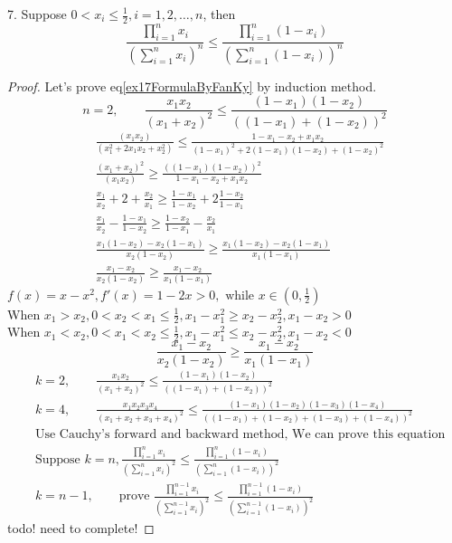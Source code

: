 \begin{example}
	7. Suppose $ 0<x_i\le \frac{1}{2}, i=1,2,\dots,n $, then
	\begin{equation}\label{ex17FormulaByFanKy}
		\frac{\prod_{i=1}^n x_i}{(\sum_{i=1}^n x_i)^n} \le \frac{\prod_{i=1}^n(1-x_i)}{(\sum_{i=1}^n(1-x_i))^n}
	\end{equation}
\begin{proof}
	Let's prove eq\ref{ex17FormulaByFanKy} by induction method.
	\begin{equation*}
		n=2,\qquad \frac{x_1x_2}{(x_1+x_2)^2}\le \frac{(1-x_1)(1-x_2)}{((1-x_1)+(1-x_2))^2}
	\end{equation*}
	\begin{align*}
		&\frac{(x_1x_2)}{(x_1^2+2x_1x_2+x_2^2)} \le \frac{1-x_1-x_2+x_1x_2}{(1-x_1)^2+2(1-x_1)(1-x_2)+(1-x_2)^2}\\
		&\frac{(x_1+x_2)^2}{(x_1x_2)} \ge \frac{((1-x_1)(1-x_2))^2}{1-x_1-x_2+x_1x_2}\\
		&\frac{x_1}{x_2} + 2 + \frac{x_2}{x_1} \ge \frac{1-x_1}{1-x_2} + 2\frac{1-x_2}{1-x_1}\\
		&\frac{x_1}{x_2} - \frac{1-x_1}{1-x_2} \ge \frac{1-x_2}{1-x_1} - \frac{x_2}{x_1}\\
		&\frac{x_1(1-x_2) - x_2(1-x_1)}{x_2(1-x_2)} \ge \frac{x_1(1-x_2)-x_2(1-x_1)}{x_1(1-x_1)}\\
		&\frac{x_1-x_2}{x_2(1-x_2)} \ge \frac{x_1 - x_2}{x_1(1-x_1)}
	\end{align*}
$ f(x) = x-x^2, f'(x) = 1-2x>0,\text{ while }x\in(0,\frac{1}{2})  $\\
When $ x_1>x_2 , 0<x_2<x_1\le \frac{1}{2}, x_1-x_1^2 \ge x_2-x_2^2, x_1-x_2>0$\\
When $ x_1<x_2 , 0<x_1<x_2\le \frac{1}{2}, x_1-x_1^2 \le x_2-x_2^2, x_1-x_2<0$\\
\begin{equation*}
	 \frac{x_1-x_2}{x_2(1-x_2)} \ge \frac{x_1 - x_2}{x_1(1-x_1)} 
\end{equation*}
\begin{align*}
	&k=2,\qquad \frac{x_1x_2}{(x_1+x_2)^2}\le \frac{(1-x_1)(1-x_2)}{((1-x_1)+(1-x_2))^2}\\
	&k=4,\qquad \frac{x_1x_2x_3x_4}{(x_1+x_2+x_3+x_4)^2}\le 
	\frac{(1-x_1)(1-x_2)(1-x_3)(1-x_4)}{((1-x_1)+(1-x_2)+(1-x_3)+(1-x_4))^2}\\
	&\text{Use Cauchy's forward and backward method, We can prove this equation}\\
	&\text{Suppose }k=n,\frac{\prod_{i=1}^n x_i}{(\sum_{i=1}^n x_i)^2} \le 
	\frac{\prod_{i=1}^n (1-x_i)}{(\sum_{i=1}^n (1-x_i))^2}\\
	&k = n-1,\qquad \text{prove  } \frac{\prod_{i=1}^{n-1} x_i}{(\sum_{i=1}^{n-1} x_i)^2} \le 
	\frac{\prod_{i=1}^{n-1} (1-x_i)}{(\sum_{i=1}^{n-1} (1-x_i))^2}
\end{align*}
todo! need to complete!
\end{proof}
\end{example}
